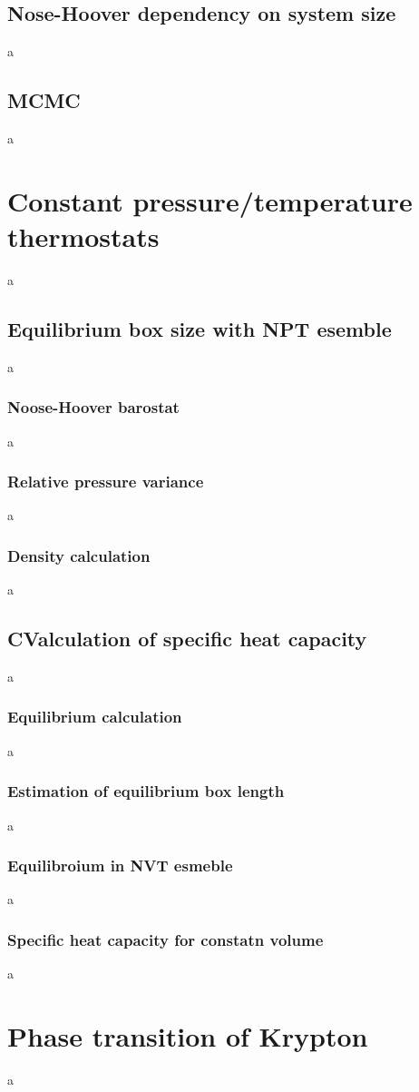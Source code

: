 \documentclass[10pt,a4paper]{report}
\begin{document}
\subsection{Nose-Hoover dependency on system size}
a
\subsection{MCMC}
a


\section{Constant pressure/temperature thermostats}
a
\subsection{Equilibrium box size with NPT esemble}
a
\subsubsection{Noose-Hoover barostat}
a
\subsubsection{Relative pressure variance}
a
\subsubsection{Density calculation}
a
\subsection{CValculation of specific heat capacity}
a
\subsubsection{Equilibrium calculation}
a
\subsubsection{Estimation of equilibrium box length}
a
\subsubsection{Equilibroium in NVT esmeble}
a
\subsubsection{Specific heat capacity for constatn volume}
a

\section{Phase transition of Krypton}
a
\end{document}
